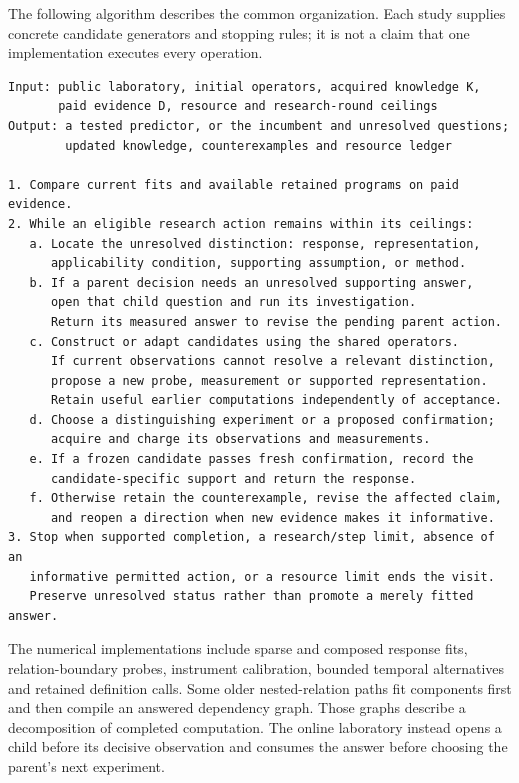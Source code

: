 \documentclass[11pt,a4paper]{article}
\begin{document}
The following algorithm describes the common organization. Each study supplies concrete candidate generators and stopping rules; it is not a claim that one implementation executes every operation.


\begin{Verbatim}[fontsize=\small,breaklines=true,breakanywhere=true]
Input: public laboratory, initial operators, acquired knowledge K,
       paid evidence D, resource and research-round ceilings
Output: a tested predictor, or the incumbent and unresolved questions;
        updated knowledge, counterexamples and resource ledger

1. Compare current fits and available retained programs on paid evidence.
2. While an eligible research action remains within its ceilings:
   a. Locate the unresolved distinction: response, representation,
      applicability condition, supporting assumption, or method.
   b. If a parent decision needs an unresolved supporting answer,
      open that child question and run its investigation.
      Return its measured answer to revise the pending parent action.
   c. Construct or adapt candidates using the shared operators.
      If current observations cannot resolve a relevant distinction,
      propose a new probe, measurement or supported representation.
      Retain useful earlier computations independently of acceptance.
   d. Choose a distinguishing experiment or a proposed confirmation;
      acquire and charge its observations and measurements.
   e. If a frozen candidate passes fresh confirmation, record the
      candidate-specific support and return the response.
   f. Otherwise retain the counterexample, revise the affected claim,
      and reopen a direction when new evidence makes it informative.
3. Stop when supported completion, a research/step limit, absence of an
   informative permitted action, or a resource limit ends the visit.
   Preserve unresolved status rather than promote a merely fitted answer.
\end{Verbatim}

The numerical implementations include sparse and composed response fits, relation-boundary probes, instrument calibration, bounded temporal alternatives and retained definition calls. Some older nested-relation paths fit components first and then compile an answered dependency graph. Those graphs describe a decomposition of completed computation. The online laboratory instead opens a child before its decisive observation and consumes the answer before choosing the parent's next experiment.
\end{document}
